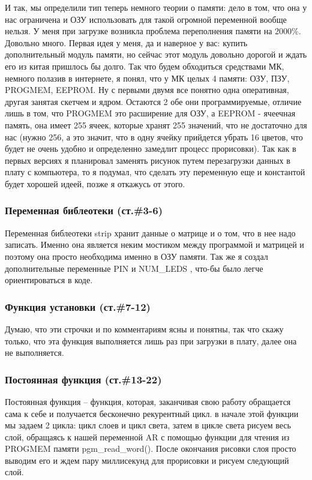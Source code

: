 \documentclass[a4paper, 12pt]{article}
\begin{document}
И так, мы определили тип теперь немного теории о памяти: дело в том, что она у
нас ограничена и ОЗУ использовать для такой огромной переменной вообще нельзя.
У меня при загрузке возникла проблема переполнения памяти на 2000\%. Довольно
много. Первая идея у меня, да и наверное у вас: купить дополнительный модуль
памяти, но сейчас этот модуль довольно дорогой и ждать его из китая пришлось
бы долго. Так что будем обходиться средствами МК, немного полазив в интернете,
я понял, что у МК целых 4 памяти: ОЗУ, ПЗУ, PROGMEM, EEPROM. Ну с первыми двумя
все понятно одна оперативная, другая занятая скетчем и ядром. Остаются 2
обе они программируемые, отличие лишь в том, что PROGMEM это расширение для
ОЗУ, а EEPROM - ячеечная память, она имеет 255 ячеек, которые хранят 255
значений, что не достаточно для нас (нужно 256, а это значит, что в одну
ячейку прийдется убрать 16 цветов, что будет не очень удобно и определенно
замедлит процесс прорисовки). Так как в первых версиях я планировал заменять
рисунок путем перезагрузки данных в плату с компьютера, то я подумал, что
сделать эту переменную еще и константой будет хорошей идеей, позже я откажусь
от этого.

\subsubsection{Переменная библеотеки (ст.\#3-6)}

Переменная библеотеки strip хранит данные о матрице и о том, что в нее надо
записать. Именно она является неким мостиком между программой и матрицей и
поэтому она просто необходима именно в ОЗУ памяти. Так же я создал
дополнительные переменные PIN и NUM\_LEDS , что-бы было легче ориентироваться в
коде.

\subsubsection{Функция установки (ст.\#7-12)}

Думаю, что эти строчки и по комментариям ясны и  понятны, так что скажу только,
что эта функция выполняется лишь раз при загрузки в плату, далее она не
выполняется.

\subsubsection{Постоянная функция (ст.\#13-22)}

Постоянная функция -- функция, которая, заканчивая свою работу обращается сама
к себе и получается бесконечно рекурентный цикл. в начале этой функции мы
задаем 2 цикла: цикл слоев и цикл света, затем в цикле света рисуем весь слой,
обращаясь к нашей переменной AR с помощью функции для чтения из PROGMEM памяти
pgm\_read\_word(). После окончания рисовки слоя просто выводим его и ждем пару
миллисекунд для прорисовки и рисуем следующий слой.
\end{document}
